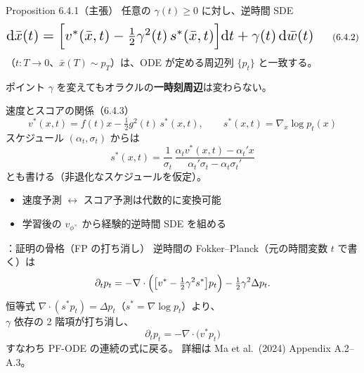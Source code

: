 \asmain
\begin{frame}{Proposition 6.4.1（主張）}
    任意の $\gamma(t)\ge 0$ に対し、逆時間 SDE
    \[
        \resizebox{0.95\textwidth}{!}{$
        \mathrm{d}\bar{x}(t)
        =
        \Bigl[
            v^{*}(\bar{x},t)
            -
            \tfrac12\gamma^{2}(t)\,s^{*}(\bar{x},t)
        \Bigr]
        \mathrm{d}t
        +
        \gamma(t)\,\mathrm{d}\bar{w}(t)
        $}
        \tag{6.4.2}
    \]
    （$t:T\to 0$、$\bar{x}(T)\sim p_T$）は、ODE が定める周辺列 $\{p_t\}$ と一致する。
    \begin{exampleblock}{ポイント}
        $\gamma$ を変えてもオラクルの\textbf{一時刻周辺}は変わらない。
    \end{exampleblock}
\end{frame}
\asmain
\begin{frame}{速度とスコアの関係（6.4.3）}
    \[
        v^{*}(x,t)
        =
        f(t)x
        -
        \tfrac12 g^{2}(t)\,s^{*}(x,t),
        \qquad
        s^{*}(x,t)
        =
        \nabla_x\log p_t(x)
    \]
    スケジュール $(\alpha_t,\sigma_t)$ からは
    \[
        s^{*}(x,t)
        =
        \frac{1}{\sigma_t}\,
        \frac{
            \alpha_t v^{*}(x,t)-\alpha_t' x
        }{
            \alpha_t'\sigma_t-\alpha_t\sigma_t'
       }
    \]
    とも書ける（非退化なスケジュールを仮定）。
    \begin{itemize}
        \item 速度予測 $\leftrightarrow$ スコア予測は代数的に変換可能
        \item 学習後の $v_{\phi^{\times}}$ から経験的逆時間 SDE を組める
    \end{itemize}
\end{frame}
\assuppl
\begin{frame}{\supplmark：証明の骨格（FP の打ち消し）}
    逆時間の Fokker--Planck（元の時間変数 $t$ で書く）は
    \[
        \partial_t p_t
        =
        -\nabla\cdot
        \Bigl(
            \bigl[v^{*}-\tfrac12\gamma^{2}s^{*}\bigr]p_t
        \Bigr)
        -
        \tfrac12\gamma^{2}\Delta p_t.
    \]
    恒等式 $\nabla\cdot(s^{*}p_t)=\Delta p_t$（$s^{*}=\nabla\log p_t$）より、\\
    $\gamma$ 依存の 2 階項が打ち消し、
    \[
        \partial_t p_t
        =
        -\nabla\cdot\bigl(v^{*}p_t\bigr)
    \]
    すなわち PF-ODE の連続の式に戻る。
    \vfill
    \footnotesize
    詳細は Ma et al.\ (2024) Appendix A.2--A.3。
\end{frame}
